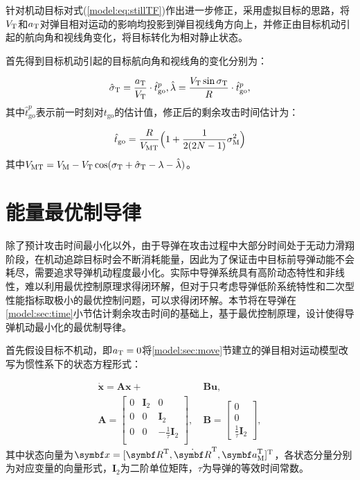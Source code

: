 针对机动目标对式(\ref{model:eq:stillTF})作出进一步修正，采用虚拟目标的思路，将$V_{\text T}$和$a_{\text T}$对弹目相对运动的影响均投影到弹目视线角方向上，并修正由目标机动引起的航向角和视线角变化，将目标转化为相对静止状态。

首先得到目标机动引起的目标航向角和视线角的变化分别为：

\begin{equation}
\label{model:eq:diffsigma}
	\hat \sigma_{\text T} = \frac{a_{\text T}}{V_{\text T}}\cdot \hat t_{\text{go}}^p,\quad \hat \lambda=\frac{V_{\text T}\sin{\sigma_{\text T}}}{R}\cdot \hat t_{\text{go}}^p,
\end{equation}
其中$\hat t_{\text{go}}^p$表示前一时刻对$t_{\text{go}}$的估计值，修正后的剩余攻击时间估计为：

\begin{equation}
\label{model:eq:modifiedTF}
	\hat t_{\text {go}} = \frac{R}{V_{\text{MT}}}\Big(1+\frac{1}{2(2N-1)}\sigma_{\text M}^2 \Big)
\end{equation}
其中$V_{\text{MT}}=V_{\text M}-V_{\text T}\cos(\sigma_{\text T}+\hat \sigma_{\text T}-\lambda-\hat \lambda)$。


\section{能量最优制导律}
\label{model:sec:energy}

除了预计攻击时间最小化以外，由于导弹在攻击过程中大部分时间处于无动力滑翔阶段，在机动追踪目标时会不断消耗能量，因此为了保证击中目标前导弹动能不会耗尽，需要追求导弹机动程度最小化。实际中导弹系统具有高阶动态特性和非线性，难以利用最优控制原理求得闭环解，但对于只考虑导弹低阶系统特性和二次型性能指标取极小的最优控制问题，可以求得闭环解。本节将在导弹在\ref{model:sec:time}小节估计剩余攻击时间的基础上，基于最优控制原理，设计使得导弹机动最小化的最优制导律。

首先假设目标不机动，即$a_{\text T}=0$将\ref{model:sec:move}节建立的弹目相对运动模型改写为惯性系下的状态方程形式：

\begin{align}
\label{model:eq:state}
	\dot{\bm{x}} = \bm{Ax}+&\bm{Bu},\\
	\bm{A} = \begin{bmatrix}
		0 & {\bm I}_2 & 0\\
		0 & 0 & {\bm I}_2\\
		0 & 0 & -\frac{1}{\tau}{\bm I}_2\\
	\end{bmatrix},\ 
	&\bm{B} = \begin{bmatrix}
		0\\0\\\frac{1}{\tau}{\bm I}_2
	\end{bmatrix},
\end{align}
其中状态向量为${\bm x}=[{\bm R}^{\mathrm T},{\dot{\bm R}}^{\mathrm T},{\bm a}_{\text M}^{\mathrm T}]^{\mathrm T}$，各状态分量分别为对应变量的向量形式，${\bm I}_2$为二阶单位矩阵，$\tau$为导弹的等效时间常数。

